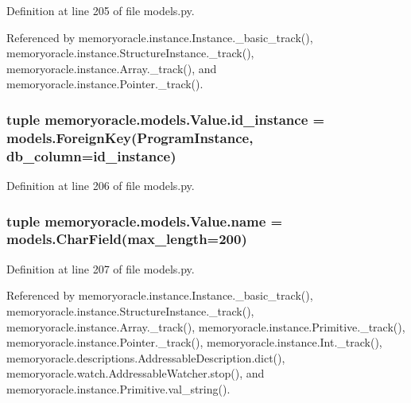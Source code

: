 Definition at line 205 of file models.\+py.



Referenced by memoryoracle.\+instance.\+Instance.\+\_\+basic\+\_\+track(), memoryoracle.\+instance.\+Structure\+Instance.\+\_\+track(), memoryoracle.\+instance.\+Array.\+\_\+track(), and memoryoracle.\+instance.\+Pointer.\+\_\+track().

\hypertarget{classmemoryoracle_1_1models_1_1Value_a68f30f290c29fda843570179c1a16b14}{}
\subsubsection[{id\+\_\+instance}]{\setlength{\rightskip}{0pt plus 5cm}tuple memoryoracle.\+models.\+Value.\+id\+\_\+instance = models.\+Foreign\+Key({\bf Program\+Instance}, db\+\_\+column=\textquotesingle{}id\+\_\+instance\textquotesingle{})\hspace{0.3cm}{\ttfamily [static]}}\label{classmemoryoracle_1_1models_1_1Value_a68f30f290c29fda843570179c1a16b14}


Definition at line 206 of file models.\+py.

\hypertarget{classmemoryoracle_1_1models_1_1Value_aeb0e8d35b51e2b0b579d6ded9de432eb}{}
\subsubsection[{name}]{\setlength{\rightskip}{0pt plus 5cm}tuple memoryoracle.\+models.\+Value.\+name = models.\+Char\+Field(max\+\_\+length=200)\hspace{0.3cm}{\ttfamily [static]}}\label{classmemoryoracle_1_1models_1_1Value_aeb0e8d35b51e2b0b579d6ded9de432eb}


Definition at line 207 of file models.\+py.



Referenced by memoryoracle.\+instance.\+Instance.\+\_\+basic\+\_\+track(), memoryoracle.\+instance.\+Structure\+Instance.\+\_\+track(), memoryoracle.\+instance.\+Array.\+\_\+track(), memoryoracle.\+instance.\+Primitive.\+\_\+track(), memoryoracle.\+instance.\+Pointer.\+\_\+track(), memoryoracle.\+instance.\+Int.\+\_\+track(), memoryoracle.\+descriptions.\+Addressable\+Description.\+dict(), memoryoracle.\+watch.\+Addressable\+Watcher.\+stop(), and memoryoracle.\+instance.\+Primitive.\+val\+\_\+string().

